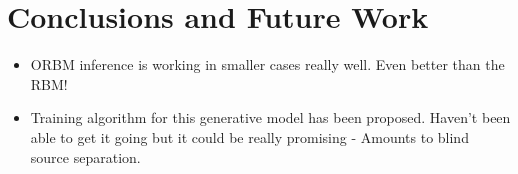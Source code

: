 \chapter{Conclusions and Future Work}

\begin{itemize}
  \item ORBM inference is working in smaller cases really well. Even better than the RBM!
  \item Training algorithm for this generative model has been proposed. Haven't been able to get it going but it could be really promising - Amounts to blind source separation.
\end{itemize}
